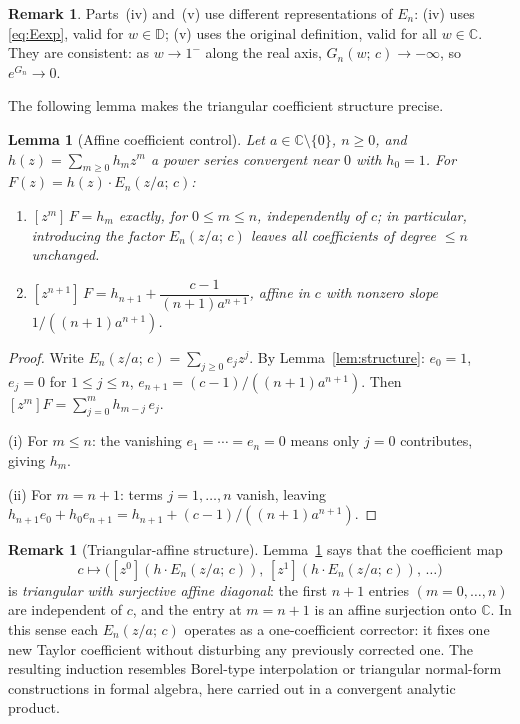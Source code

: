 \documentclass{amsart}
\newtheorem{lemma}[theorem]{Lemma}
\theoremstyle{definition}
\newtheorem{remark}[theorem]{Remark}
\newcommand{\D}{\mathbb{D}}
\newcommand{\C}{\mathbb{C}}
\begin{document}
\begin{remark}
Parts~(iv) and~(v) use different representations of $E_n$: (iv) uses
\eqref{eq:Eexp}, valid for $w \in \D$; (v) uses the original definition,
valid for all $w \in \C$.  They are consistent: as $w \to 1^-$ along
the real axis, $G_n(w;\,c) \to -\infty$, so $e^{G_n} \to 0$.
\end{remark}

The following lemma makes the triangular coefficient structure precise.

\begin{lemma}[Affine coefficient control]
\label{lem:affine}
Let $a \in \C \setminus \{0\}$, $n \geq 0$, and $h(z) =
\sum_{m \geq 0} h_m z^m$ a power series convergent near $0$ with
$h_0 = 1$.  For $F(z) = h(z)\cdot E_n(z/a;\,c)$:
\begin{enumerate}
\item[(i)] $[z^m]\,F = h_m$ exactly, for $0 \leq m \leq n$,
  independently of $c$; in particular, introducing the factor
  $E_n(z/a;\,c)$ leaves all coefficients of degree $\leq n$ unchanged.
\item[(ii)] $[z^{n+1}]\,F = h_{n+1} + \dfrac{c-1}{(n+1)a^{n+1}}$,
  affine in $c$ with nonzero slope $1/((n+1)a^{n+1})$.
\end{enumerate}
\end{lemma}

\begin{proof}
Write $E_n(z/a;\,c) = \sum_{j \geq 0} e_j z^j$.  By
Lemma~\ref{lem:structure}: $e_0 = 1$, $e_j = 0$ for $1 \leq j \leq n$,
$e_{n+1} = (c-1)/((n+1)a^{n+1})$.  Then $[z^m]F = \sum_{j=0}^m
h_{m-j}\,e_j$.

(i) For $m \leq n$: the vanishing $e_1 = \cdots = e_n = 0$ means only
$j=0$ contributes, giving $h_m$.

(ii) For $m=n+1$: terms $j=1,\ldots,n$ vanish, leaving
$h_{n+1}e_0 + h_0 e_{n+1} = h_{n+1} + (c-1)/((n+1)a^{n+1})$.
\end{proof}

\begin{remark}[Triangular-affine structure]
\label{rem:triangular}
Lemma~\ref{lem:affine} says that the coefficient map
\[
  c \mapsto \bigl([z^0](h\cdot E_n(z/a;\,c)),\,
                  [z^1](h\cdot E_n(z/a;\,c)),\,\ldots\bigr)
\]
is \emph{triangular with surjective affine diagonal}: the first $n+1$
entries $(m = 0,\ldots,n)$ are independent of $c$, and the entry at
$m = n+1$ is an affine surjection onto $\C$.  In this sense each $E_n(z/a;\,c)$ operates as a one-coefficient
corrector: it fixes one new Taylor coefficient without disturbing any
previously corrected one.  The resulting induction resembles Borel-type
interpolation or
triangular normal-form constructions in formal algebra, here carried
out in a convergent analytic product.
\end{remark}
\end{document}
